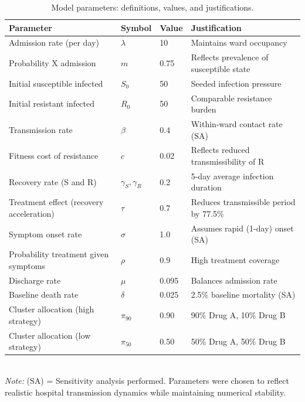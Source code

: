 \begin{table}[htbp]
\centering
\caption{Model parameters: definitions, values, and justifications.}
\label{tab:parameters}
\begin{tabular}{llll}
\toprule
\textbf{Parameter} & \textbf{Symbol} & \textbf{Value} & \textbf{Justification} \\
\midrule
Admission rate (per day) & $\lambda$ & 10 & Maintains ward occupancy \\
Probability X admission & $m$ & 0.75 & Reflects prevalence of susceptible state \\
Initial susceptible infected & $S_0$ & 50 & Seeded infection pressure \\
Initial resistant infected & $R_0$ & 50 & Comparable resistance burden \\
Transmission rate & $\beta$ & 0.4 & Within-ward contact rate (SA) \\
Fitness cost of resistance & $c$ & 0.02 & Reflects reduced transmissibility of R \\
Recovery rate (S and R) & $\gamma_S, \gamma_R$ & 0.2 & 5-day average infection duration \\
Treatment effect (recovery acceleration) & $\tau$ & 0.7 & Reduces transmissible period by 77.5\% \\
Symptom onset rate & $\sigma$ & 1.0 & Assumes rapid (1-day) onset (SA) \\
Probability treatment given symptoms & $\rho$ & 0.9 & High treatment coverage \\
Discharge rate & $\mu$ & 0.095 & Balances admission rate \\
Baseline death rate & $\delta$ & 0.025 & 2.5\% baseline mortality (SA) \\
Cluster allocation (high strategy) & $\pi_{90}$ & 0.90 & 90\% Drug A, 10\% Drug B \\
Cluster allocation (low strategy) & $\pi_{50}$ & 0.50 & 50\% Drug A, 50\% Drug B \\
\bottomrule
\end{tabular}
\\
\footnotesize
\textit{Note:} (SA) = Sensitivity analysis performed. Parameters were chosen to reflect realistic hospital
transmission dynamics while maintaining numerical stability.
\end{table}


